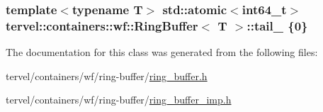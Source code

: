 \subsubsection[{tail\+\_\+}]{\setlength{\rightskip}{0pt plus 5cm}template$<$typename T$>$ std\+::atomic$<$int64\+\_\+t$>$ {\bf tervel\+::containers\+::wf\+::\+Ring\+Buffer}$<$ T $>$\+::tail\+\_\+ \{0\}\hspace{0.3cm}{\ttfamily [private]}}\label{classtervel_1_1containers_1_1wf_1_1_ring_buffer_acd823ce60f711bf6ea20799992844183}


The documentation for this class was generated from the following files\+:\begin{DoxyCompactItemize}
\item 
tervel/containers/wf/ring-\/buffer/\hyperlink{ring__buffer_8h}{ring\+\_\+buffer.\+h}\item 
tervel/containers/wf/ring-\/buffer/\hyperlink{ring__buffer__imp_8h}{ring\+\_\+buffer\+\_\+imp.\+h}\end{DoxyCompactItemize}
